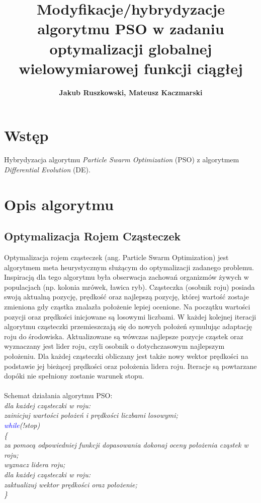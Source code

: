 \documentclass{article}
\title{Modyfikacje/hybrydyzacje algorytmu PSO w zadaniu optymalizacji globalnej wielowymiarowej funkcji ciągłej}
\author{
\textbf{Jakub Ruszkowski, Mateusz Kaczmarski}\\
	}
\begin{document}
\maketitle

 \section{Wstęp}
Hybrydyzacja algorytmu \textit{Particle Swarm Optimization} (PSO) z algorytmem \textit{Differential Evolution} (DE).
 \section{Opis algorytmu}
 \subsection{Optymalizacja Rojem Cząsteczek}
 Optymalizacja rojem cząsteczek (ang. Particle Swarm Optimization) jest algorytmem meta heurystycznym służącym do optymalizacji zadanego problemu. Inspiracją dla tego algorytmu była obserwacja zachowań organizmów żywych w populacjach (np. kolonia mrówek, ławica ryb). Cząsteczka (osobnik roju) posiada swoją aktualną pozycję, prędkość oraz najlepszą pozycję, której wartość zostaje zmieniona gdy cząstka znalazła położenie lepiej ocenione. Na początku wartości pozycji oraz prędkości inicjowane są losowymi liczbami. W każdej kolejnej iteracji algorytmu cząsteczki przemieszczają się do nowych położeń symulując adaptację roju do środowiska. Aktualizowane są wówczas najlepsze pozycje cząstek oraz wyznaczany jest lider roju, czyli osobnik o dotychczasowym najlepszym położeniu. Dla każdej cząsteczki obliczany jest także nowy wektor prędkości na podstawie jej bieżącej prędkości oraz położenia lidera roju. Iteracje są powtarzane dopóki nie spełniony zostanie warunek stopu.\\\\
 Schemat działania algorytmu PSO:\\
 \textit{
\indent dla każdej cząsteczki w roju:\\
\indent \indent zainicjuj wartości położeń i prędkości liczbami losowymi;\\
\indent \textcolor{blue}{while}(!stop)\\
\indent \{\\
\indent \indent za pomocą odpowiedniej funkcji dopasowania dokonaj oceny położenia cząstek w roju;\\
\indent \indent wyznacz lidera roju;\\
\indent \indent dla każdej cząsteczki w roju:\\
\indent \indent \indent zaktualizuj wektor prędkości oraz położenie;\\
\indent \}\\
 }\\\\
\end{document}
